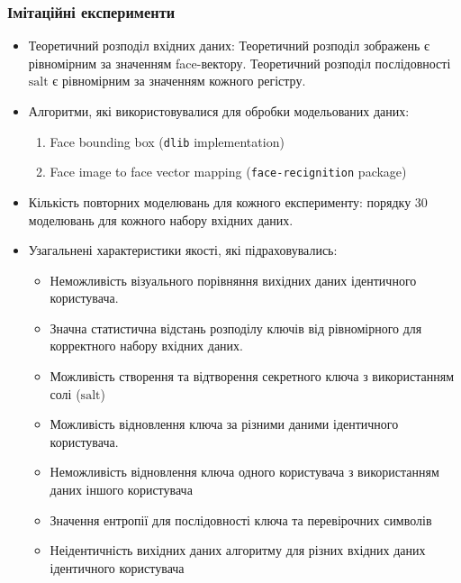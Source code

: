 \documentclass[11pt]{article}
\providecommand{\tightlist}{%
      \setlength{\itemsep}{0pt}\setlength{\parskip}{0pt}}
\begin{document}
    \hypertarget{ux456ux43cux456ux442ux430ux446ux456ux439ux43dux456-ux435ux43aux441ux43fux435ux440ux438ux43cux435ux43dux442ux438}{%
\subsubsection{Імітаційні
експерименти}\label{ux456ux43cux456ux442ux430ux446ux456ux439ux43dux456-ux435ux43aux441ux43fux435ux440ux438ux43cux435ux43dux442ux438}}

\begin{itemize}
\tightlist
\item
  Теоретичний розподіл вхідних даних: Теоретичний розподіл зображень є
  рівномірним за значенням face-вектору. Теоретичний розподіл
  послідовності \(\text{salt}\) є рівномірним за значенням кожного
  регістру.
\item
  Алгоритми, які використовувалися для обробки модельованих даних:

  \begin{enumerate}
  \def\labelenumi{\arabic{enumi}.}
  \tightlist
  \item
    Face bounding box (\texttt{dlib} implementation)
  \item
    Face image to face vector mapping (\texttt{face-recignition}
    package)
  \end{enumerate}
\item
  Кількість повторних моделювань для кожного експерименту: порядку 30
  моделювань для кожного набору вхідних даних.
\item
  Узагальнені характеристики якості, які підраховувались:

  \begin{itemize}
  \tightlist
  \item
    Неможливість візуального порівняння вихідних даних ідентичного
    користувача.
  \item
    Значна статистична відстань розподілу ключів від рівномірного для
    корректного набору вхідних даних.
  \item
    Можливість створення та відтворення секретного ключа з використанням
    солі (\(\text{salt}\))
  \item
    Можливість відновлення ключа за різними даними ідентичного
    користувача.
  \item
    Неможливість відновлення ключа одного користувача з використанням
    даних іншого користувача
  \item
    Значення ентропії для послідовності ключа та перевірочних символів
  \item
    Неідентичність вихідних даних алгоритму для різних вхідних даних
    ідентичного користувача
  \end{itemize}
\end{itemize}
\end{document}
